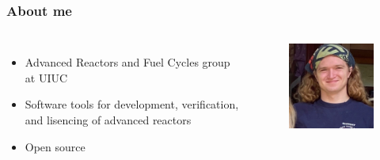\begin{frame}
    \frametitle{About me}
    \begin{columns}
        \column[t]{5cm}
        \begin{itemize}
            \item Advanced Reactors and Fuel Cycles group at UIUC
            \item Software tools for development, verification, and lisencing of advanced reactors
            \item Open source
        \end{itemize}
        
        \column[t]{5cm}
        \begin{figure}[htpb]
            \centering
            \includegraphics[width=5cm]{images/yardaso.jpeg}
        \end{figure}

    \end{columns}
\end{frame}

